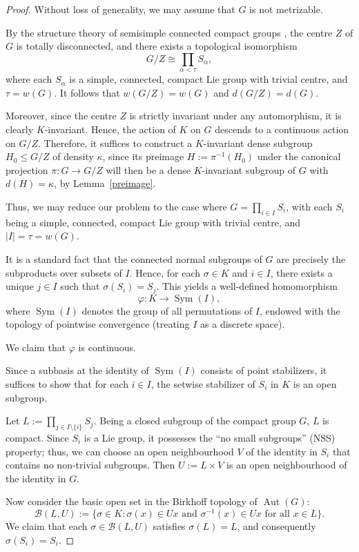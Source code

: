 \documentclass[12pt]{amsart}
\theoremstyle{definition}
\numberwithin{equation}{section}
\theoremstyle{remark}
\def\Aut{\operatorname{Aut}}
\def\Sym{\operatorname{Sym}}
\begin{document}
\begin{proof}
Without loss of generality, we may assume that $G$ is not metrizable.

By the structure theory of semisimple connected compact groups \cite[Theorem~9.19]{HM}, the centre $Z$ of $G$ is totally disconnected, and there exists a topological isomorphism
\[
G/Z \cong \prod_{\alpha < \tau} S_\alpha,
\]
where each $S_\alpha$ is a simple, connected, compact Lie group with trivial centre, and $\tau = w(G)$. 
It follows that $w(G/Z) = w(G)$ and $d(G/Z) = d(G)$.

Moreover, since the centre $Z$ is strictly invariant under any automorphism, it is clearly $K$-invariant. Hence, the action of $K$ on $G$ descends to a continuous action on $G/Z$. 
Therefore, it suffices to construct a $K$-invariant dense subgroup $H_0 \leq G/Z$ of density $\kappa$, since its preimage $H := \pi^{-1}(H_0)$ under the canonical projection $\pi: G \to G/Z$ will then be a dense $K$-invariant subgroup of $G$ with $d(H) = \kappa$, by Lemma~\ref{preimage}.

Thus, we may reduce our problem to the case where $G = \prod_{i \in I} S_i$, with each $S_i$ being a simple, connected, compact Lie group with trivial centre, and $|I| = \tau = w(G)$.

It is a standard fact that the connected normal subgroups of $G$ are precisely the subproducts over subsets of $I$. 
Hence, for each $\sigma \in K$ and $i \in I$, there exists a unique $j \in I$ such that $\sigma(S_i) = S_j$. This yields a well-defined homomorphism
\[
\varphi: K \to \Sym(I),
\]
where $\Sym(I)$ denotes the group of all permutations of $I$, endowed with the topology of pointwise convergence (treating $I$ as a discrete space).

We claim that $\varphi$ is continuous. 

Since a subbasis at the identity of $\Sym(I)$ consists of point stabilizers, it suffices to show that for each $i \in I$, the setwise stabilizer of $S_i$ in $K$ is an open subgroup.

Let $L := \prod_{j \in I \setminus \{i\}} S_j$. Being a closed subgroup of the compact group $G$, $L$ is compact. Since $S_i$ is a Lie group, it possesses the ``no small subgroups'' (NSS) property; thus, we can choose an open neighbourhood $V$ of the identity in $S_i$ that contains no non-trivial subgroups. 
Then $U := L \times V$ is an open neighbourhood of the identity in $G$. 

Now consider the basic open set in the Birkhoff topology of $\Aut(G)$:
\[
\mathcal{B}(L, U) := \{\sigma \in K : \sigma(x) \in Ux \text{ and } \sigma^{-1}(x) \in Ux \text{ for all } x \in L\}.
\]
We claim that each $\sigma \in \mathcal{B}(L, U)$ satisfies $\sigma(L) = L$, and consequently $\sigma(S_i) = S_i$.


\end{proof}
\end{document}
